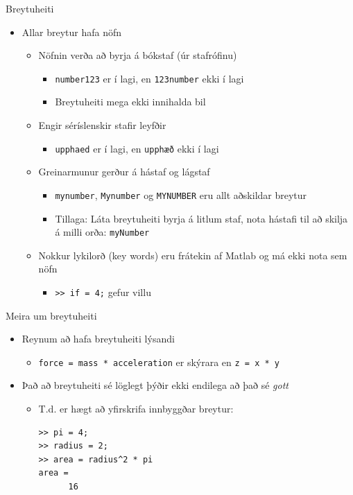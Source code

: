 \documentclass{beamer}
\begin{document}
\begin{frame}{Breytuheiti}
\begin{itemize}
 \item Allar breytur hafa nöfn
 \begin{itemize}
  \item Nöfnin verða að byrja á bókstaf (úr stafrófinu)
  \begin{itemize}
   \item \texttt{number123} er í lagi, en  \texttt{123number}  ekki í lagi
   \item Breytuheiti mega ekki innihalda bil
  \end{itemize}
  \item Engir séríslenskir stafir leyfðir
  \begin{itemize}
   \item \texttt{upphaed}  er í lagi, en  \texttt{upphæð}  ekki í lagi
  \end{itemize}
  \item Greinarmunur gerður á hástaf og lágstaf
  \begin{itemize}
   \item \texttt{mynumber}, \texttt{Mynumber} og \texttt{MYNUMBER} eru allt aðskildar breytur
   \item Tillaga: Láta breytuheiti byrja á litlum staf, nota hástafi til að skilja á milli orða: \texttt{myNumber}
  \end{itemize}
  \item Nokkur lykilorð (key words) eru frátekin af Matlab og má ekki nota sem nöfn
  \begin{itemize}
   \item \texttt{>> if = 4;}    gefur villu
  \end{itemize}
 \end{itemize}
\end{itemize}
\end{frame}

\begin{frame}[fragile]{Meira um breytuheiti}
\begin{itemize}
 \item Reynum að hafa breytuheiti lýsandi
 \begin{itemize}
  \item \texttt{force = mass * acceleration} er skýrara en \texttt{z = x * y} 
 \end{itemize}
 \item Það að breytuheiti sé löglegt þýðir ekki endilega að það sé \emph{gott}
 \begin{itemize}
  \item T.d. er hægt að yfirskrifa innbyggðar breytur:
\begin{verbatim}
>> pi = 4;
>> radius = 2;
>> area = radius^2 * pi
area = 
      16
\end{verbatim}
 \end{itemize}
\end{itemize}
\end{frame}
\end{document}
